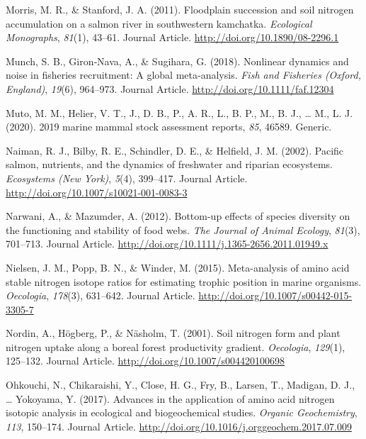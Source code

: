 \documentclass [11pt, proquest] {uwthesis}[2015/03/03]
\begin{document}
\hypertarget{ref-Morris2011}{}
Morris, M. R., \& Stanford, J. A. (2011). Floodplain succession and soil
nitrogen accumulation on a salmon river in southwestern kamchatka.
\emph{Ecological Monographs}, \emph{81}(1), 43--61. Journal Article.
\url{http://doi.org/10.1890/08-2296.1}

\hypertarget{ref-Munch2018}{}
Munch, S. B., Giron‐Nava, A., \& Sugihara, G. (2018). Nonlinear dynamics
and noise in fisheries recruitment: A global meta‐analysis. \emph{Fish
and Fisheries (Oxford, England)}, \emph{19}(6), 964--973. Journal
Article. \url{http://doi.org/10.1111/faf.12304}

\hypertarget{ref-Muto2020}{}
Muto, M. M., Helier, V. T., J., D. B., P., A. R., L., B. P., M., B. J.,
\ldots{} M., L. J. (2020). 2019 marine mammal stock assessment reports,
\emph{85}, 46589. Generic.

\hypertarget{ref-Naiman2002}{}
Naiman, R. J., Bilby, R. E., Schindler, D. E., \& Helfield, J. M.
(2002). Pacific salmon, nutrients, and the dynamics of freshwater and
riparian ecosystems. \emph{Ecosystems (New York)}, \emph{5}(4),
399--417. Journal Article.
\url{http://doi.org/10.1007/s10021-001-0083-3}

\hypertarget{ref-Narwani2012}{}
Narwani, A., \& Mazumder, A. (2012). Bottom-up effects of species
diversity on the functioning and stability of food webs. \emph{The
Journal of Animal Ecology}, \emph{81}(3), 701--713. Journal Article.
\url{http://doi.org/10.1111/j.1365-2656.2011.01949.x}

\hypertarget{ref-Nielsen2015}{}
Nielsen, J. M., Popp, B. N., \& Winder, M. (2015). Meta-analysis of
amino acid stable nitrogen isotope ratios for estimating trophic
position in marine organisms. \emph{Oecologia}, \emph{178}(3), 631--642.
Journal Article. \url{http://doi.org/10.1007/s00442-015-3305-7}

\hypertarget{ref-Nordin2001}{}
Nordin, A., Högberg, P., \& Näsholm, T. (2001). Soil nitrogen form and
plant nitrogen uptake along a boreal forest productivity gradient.
\emph{Oecologia}, \emph{129}(1), 125--132. Journal Article.
\url{http://doi.org/10.1007/s004420100698}

\hypertarget{ref-Ohkouchi2017}{}
Ohkouchi, N., Chikaraishi, Y., Close, H. G., Fry, B., Larsen, T.,
Madigan, D. J., \ldots{} Yokoyama, Y. (2017). Advances in the
application of amino acid nitrogen isotopic analysis in ecological and
biogeochemical studies. \emph{Organic Geochemistry}, \emph{113},
150--174. Journal Article.
\url{http://doi.org/10.1016/j.orggeochem.2017.07.009}
\end{document}

